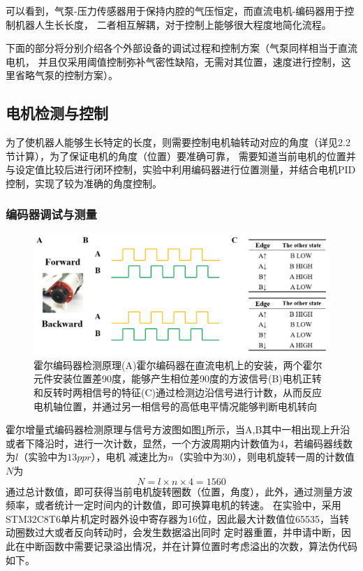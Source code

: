\documentclass[11pt, a4paper, oneside]{ctexart}
\begin{document}
可以看到，气泵-压力传感器用于保持内腔的气压恒定，而直流电机-编码器用于控制机器人生长长度，
二者相互解耦，对于控制上能够很大程度地简化流程。

下面的部分将分别介绍各个外部设备的调试过程和控制方案（气泵同样相当于直流电机，
并且仅采用阈值控制弥补气密性缺陷，无需对其位置，速度进行控制，这里省略气泵的控制方案）。

\subsection{电机检测与控制}
为了使机器人能够生长特定的长度，则需要控制电机轴转动对应的角度（详见2.2节计算），为了保证电机的角度（位置）要准确可靠，
需要知道当前电机的位置并与设定值比较后进行闭环控制，实验中利用编码器进行位置测量，并结合电机PID控制，实现了较为准确的角度控制。
\subsubsection{编码器调试与测量}
\begin{figure}[H]
    \centering
    \includegraphics[scale=0.38]{编码器电平图}
    \caption{霍尔编码器检测原理(A)霍尔编码器在直流电机上的安装，两个霍尔元件安装位置差90度，能够产生相位差90度的方波信号(B)电机正转和反转时两相信号的特征(C)通过检测边沿信号进行计数，从而反应电机轴位置，并通过另一相信号的高低电平情况能够判断电机转向}
    \label{编码器电平图}
\end{figure}

霍尔增量式编码器检测原理与信号方波图如图\ref{编码器电平图}所示，当A,B其中一相出现上升沿或者下降沿时，进行一次计数，显然，一个方波周期内计数值为4，若编码器线数为$l$（实验中为$13ppr$），电机
减速比为$n$（实验中为$30$），则电机旋转一周的计数值$N$为
$$
N=l\times n \times 4=1560
$$
通过总计数值，即可获得当前电机旋转圈数（位置，角度），此外，通过测量方波频率，或者统计一定时间内的计数值，即可换算电机的转速。
在实验中，采用STM32C8T6单片机定时器外设中寄存器为16位，因此最大计数值位65535，当转动圈数过大或者反向转动时，会发生数据溢出同时
定时器重置，并申请中断，因此在中断函数中需要记录溢出情况，并在计算位置时考虑溢出的次数，算法伪代码如下。
\end{document}
